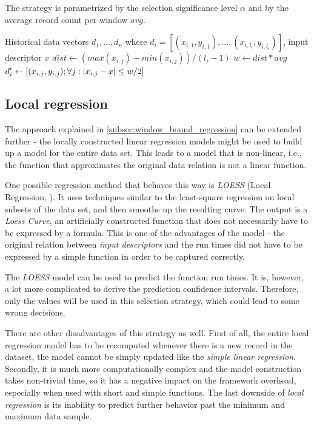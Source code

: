 The strategy is parametrized by the selection significance level $\alpha$ and by the average record count per window $avg$.

\begin{algorithmic}[1] %
	\INPUT Historical data vectors $d_1,...,d_n$ where $d_i = [(x_{i,1}, y_{i,1}),...,(x_{i,l_i}, y_{i,l_i})]$, input descriptor $x$
	\State $dist \gets (max(x_{i,j}) - min(x_{i,j})) / (l_i-1)$
	\State $w \gets dist * avg$
	\State $d'_i \gets [(x_{i,j}, y_{i, j}); \forall j: \left|{x_{i,j} - x}\right| \leq w/2]$
	\EndFor
	\State {}
\end{algorithmic}

\subsection{Local regression}
\label{subsec:local_regression}

The approach explained in \ref{subsec:window_bound_regression} can be extended further - the locally constructed linear regression models might be used to build up a model for the entire data set. This leads to a model that is non-linear, i.e., the function that approximates the original data relation is not a linear function.

One possible regression method that behaves this way is \textit{LOESS} (Local Regression, \cite{cleveland_locally_1988,cleveland_regression_1988,cleveland_computational_1991}). It uses techniques similar to the least-square regression on local subsets of the data set, and then smooths up the resulting curve. The output is a \textit{Loess Curve}, an artificially constructed function that does not necessarily have to be expressed by a formula. This is one of the advantages of the model - the original relation between \textit{input descriptors} and the run times did not have to be expressed by a simple function in order to be captured correctly.

The \textit{LOESS} model can be used to predict the function run times. It is, however, a lot more complicated to derive the prediction confidence intervals. Therefore, only the values will be used in this selection strategy, which could lead to some wrong decisions.

There are other disadvantages of this strategy as well. First of all, the entire local regression model has to be recomputed whenever there is a new record in the dataset, the model cannot be simply updated like the \textit{simple linear regression}. Secondly, it is much more computationally complex and the model construction takes non-trivial time, so it has a negative impact on the framework overhead, especially when used with short and simple functions. The last downside of \textit{local regression} is its inability to predict further behavior past the minimum and maximum data sample.

